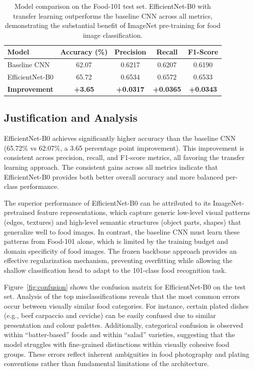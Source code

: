 \documentclass{article}
\begin{document}
\begin{table}[h]
    \caption{Model comparison on the Food-101 test set. EfficientNet-B0 with transfer
    learning outperforms the baseline CNN across all metrics, demonstrating the 
    substantial benefit of ImageNet pre-training for food image classification.}
    \label{tab:results}
    \centering
    \begin{tabular}{lcccc}
        \toprule
        Model           & Accuracy (\%) & Precision & Recall & F1-Score \\
        \midrule
        Baseline CNN    & 62.07         & 0.6217    & 0.6207 & 0.6190 \\
        EfficientNet-B0 & 65.72         & 0.6534    & 0.6572 & 0.6533 \\
        \midrule
        \textbf{Improvement} & \textbf{+3.65} & \textbf{+0.0317} & \textbf{+0.0365} & \textbf{+0.0343} \\
        \bottomrule
    \end{tabular}
\end{table}

\subsection{Justification and Analysis}

EfficientNet-B0 achieves significantly higher accuracy than the baseline CNN
(65.72\% vs 62.07\%, a 3.65 percentage point improvement). This improvement
is consistent across precision, recall, and F1-score metrics, all favoring the
transfer learning approach. The consistent gains across all metrics indicate that
EfficientNet-B0 provides both better overall accuracy and more balanced per-class
performance.

The superior performance of EfficientNet-B0 can be attributed to its ImageNet-pretrained
feature representations, which capture generic low-level visual patterns (edges, textures)
and high-level semantic structures (object parts, shapes) that generalize well to food images.
In contrast, the baseline CNN must learn these patterns from Food-101 alone, which is
limited by the training budget and domain specificity of food images. The frozen backbone
approach provides an effective regularization mechanism, preventing overfitting while
allowing the shallow classification head to adapt to the 101-class food recognition task.

Figure~\ref{fig:confusion} shows the confusion matrix for EfficientNet-B0 on the test set.
Analysis of the top misclassifications reveals that the most common errors occur between
visually similar food categories. For instance, certain plated dishes (e.g., beef carpaccio
and ceviche) can be easily confused due to similar presentation and colour palettes.
Additionally, categorical confusion is observed within ``batter-based'' foods and within
``salad'' varieties, suggesting that the model struggles with fine-grained distinctions
within visually cohesive food groups. These errors reflect inherent ambiguities in food
photography and plating conventions rather than fundamental limitations of the architecture.
\end{document}
